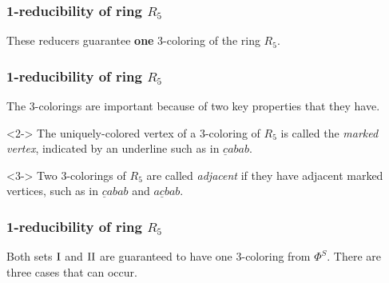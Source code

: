 \begin{frame}
    \frametitle{1-reducibility of ring $R_5$}

    These reducers guarantee \textbf{one} 3-coloring of the ring $R_5$.


\end{frame}

\begin{frame}
    \frametitle{1-reducibility of ring $R_5$}
    The 3-colorings are important because of two key properties that they have.

    \begin{definition}<2->
        The uniquely-colored vertex of a 3-coloring of $R_5$ is called the \emph{marked vertex}, indicated by an underline such as in $\underline{c}abab$.
    \end{definition}
    
    \begin{definition}<3->
        Two 3-colorings of $R_5$ are called \emph{adjacent} if they have adjacent marked vertices, such as in $\underline{c}abab$ and $a\underline{c}bab$.
    \end{definition}
\end{frame}

\begin{frame}
    \frametitle{1-reducibility of ring $R_5$}
    Both sets $\text{I}$ and $\text{II}$ are guaranteed to have one 3-coloring from $\Phi^S$. There are three cases that can occur.

    \vspace{1cm}
    \begin{enumerate}
    \end{enumerate}
\end{frame}

